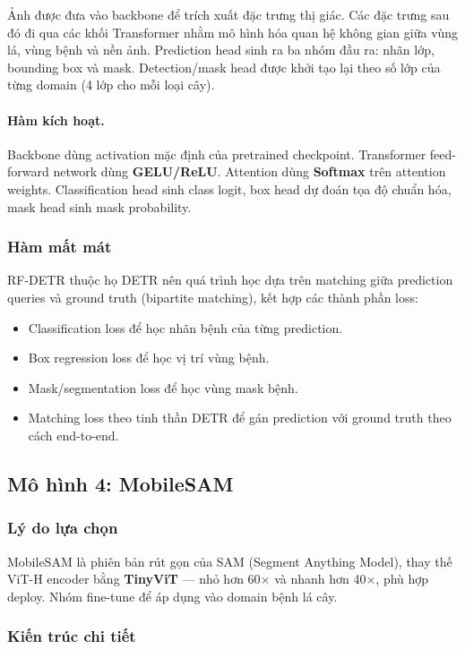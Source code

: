 Ảnh được đưa vào backbone để trích xuất đặc trưng thị giác. Các đặc trưng sau đó đi qua các khối Transformer nhằm mô hình hóa quan hệ không gian giữa vùng lá, vùng bệnh và nền ảnh. Prediction head sinh ra ba nhóm đầu ra: nhãn lớp, bounding box và mask. Detection/mask head được khởi tạo lại theo số lớp của từng domain (4 lớp cho mỗi loại cây).

\paragraph{Hàm kích hoạt.}
Backbone dùng activation mặc định của pretrained checkpoint. Transformer feed-forward network dùng \textbf{GELU/ReLU}. Attention dùng \textbf{Softmax} trên attention weights. Classification head sinh class logit, box head dự đoán tọa độ chuẩn hóa, mask head sinh mask probability.

\subsubsection{Hàm mất mát}
RF-DETR thuộc họ DETR nên quá trình học dựa trên matching giữa prediction queries và ground truth (bipartite matching), kết hợp các thành phần loss:
\begin{itemize}
    \item Classification loss để học nhãn bệnh của từng prediction.
    \item Box regression loss để học vị trí vùng bệnh.
    \item Mask/segmentation loss để học vùng mask bệnh.
    \item Matching loss theo tinh thần DETR để gán prediction với ground truth theo cách end-to-end.
\end{itemize}

\subsection{Mô hình 4: MobileSAM}
\label{subsec:mobilesam}

\subsubsection{Lý do lựa chọn}
MobileSAM \cite{mobile_sam} là phiên bản rút gọn của SAM (Segment Anything Model), thay thế ViT-H encoder bằng \textbf{TinyViT} --- nhỏ hơn 60× và nhanh hơn 40×, phù hợp deploy. Nhóm fine-tune để áp dụng vào domain bệnh lá cây.

\subsubsection{Kiến trúc chi tiết}

